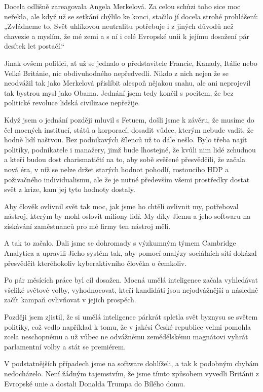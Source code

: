 Docela odlišně zareagovala Angela Merkelová. Za celou schůzi toho sice moc neřekla, ale když už se setkání chýlilo ke konci, stačilo jí docela strohé prohlášení: „Zvládneme to. Svět uhlíkovou neutralitu potřebuje i z jiných důvodů než chavezie a myslím, že mé zemi a s ní i celé Evropské unii k jejímu dosažení pár desítek let postačí.“

Jinak ovšem politici, ať už se jednalo o představitele Francie, Kanady, Itálie nebo Velké Británie, nic obdivuhodného nepředvedli. Nikdo z nich nejen že se neodvážil tak jako Merkelová přislíbit alespoň nějakou snahu, ale ani neprojevil tak bystrou mysl jako Obama. Jednání jsem tedy končil s pocitem, že bez politické revoluce lidská civilizace nepřežije. 
 
Když jsem o jednání později mluvil s Fetuem, došli jsme k závěru, že musíme do čel mocných institucí, států a korporací, dosadit vůdce, kterým nebude vadit, že hodně lidí naštvou. Bez podnikavých šílenců už to dále nešlo. Bylo třeba najít politiky, podnikatele i manažery, jimž bude lhostejné, že kvůli nim lidé zchudnou a kteří budou dost charismatičtí na to, aby sobě svěřené přesvědčili, že začala nová éra, v níž se nelze držet starých hodnot pohodlí, rostoucího HDP a poživačného individualismu, ale že je nutné především všemi prostředky dostat svět z krize, kam jej tyto hodnoty dostaly.

Aby člověk ovlivnil svět tak moc, jak jsme ho chtěli ovlivnit my, potřeboval nástroj, kterým by mohl oslovit miliony lidí. My díky Jiemu a jeho softwaru na získávání zaměstnanců pro mé firmy ten nástroj měli.

A tak to začalo. Dali jsme se dohromady s výzkumným týmem Cambridge Analytica a upravili Jieho systém tak, aby pomocí analýzy sociálních sítí dokázal přesvědčit kteréhokoliv kyberaktivního člověka o čemkoliv.

Po pár měsících práce byl cíl dosažen. Mocná umělá inteligence začala vyhledávat všeliké světové volby, vyhodnocovat, kteří kandidáti jsou nejodvážnější a následně začít kampaň ovlivňovat v jejich prospěch.

Později jsem zjistil, že si umělá inteligence párkrát spletla svět byznysu se světem politiky, což vedlo například k tomu, že v jakési České republice velmi pomohla zcela neschopnému a už vůbec ne odvážnému zemědělskému magnátovi vyhrát parlamentní volby a stát se premiérem.

V podstatnějších případech jsme na software dohlíželi, a tak k podobným chybám nedocházelo. Není žádným tajemstvím, že jsme tímto způsobem vyvedli Británii z Evropské unie a dostali Donalda Trumpa do Bílého domu.

